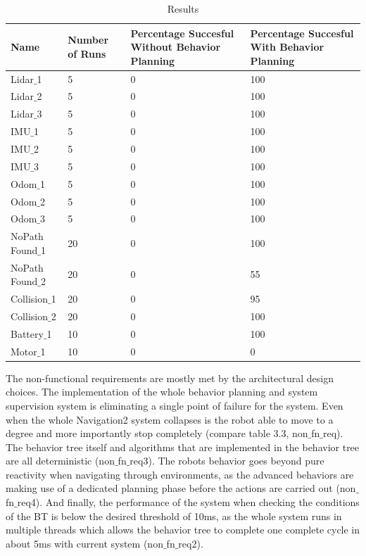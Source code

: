 \begin{table}[h!]
\caption{Results}
	\begin{tabular}{| m{} | m{}| m{} | m{}|} 
  	\hline
  	Name & Number of Runs &  Percentage Succesful Without Behavior Planning & Percentage Succesful With Behavior Planning\\ 
  	\hline
  	Lidar$\_$1 & 5 & 0 & 100 \\ 
  	\hline
  	Lidar$\_$2 & 5 & 0 & 100 \\ 
  	\hline
  	Lidar$\_$3 & 5 & 0 & 100 \\ 
  	\hline
  	IMU$\_$1 & 5 & 0 & 100 \\ 
  	\hline
  	IMU$\_$2 & 5 & 0 & 100 \\ 
  	\hline
  	IMU$\_$3 & 5 & 0 & 100 \\ 
  	\hline
  	Odom$\_$1 & 5 & 0 & 100 \\ 
  	\hline
  	Odom$\_$2 & 5 & 0 & 100 \\ 
  	\hline
  	Odom$\_$3 & 5 & 0 & 100 \\ 
  	\hline
  	NoPath Found$\_$1 & 20 & 0 & 100 \\ 
  	\hline
  	NoPath Found$\_$2 & 20 & 0 & 55 \\ 
  	\hline
  	Collision$\_$1 & 20 & 0 & 95 \\ 
  	\hline
  	Collision$\_$2 & 20 & 0 & 100 \\ 
  	\hline
  	Battery$\_$1 & 10 & 0 & 100 \\ 
  	\hline
  	Motor$\_$1 & 10 & 0 & 0 \\ 
  	\hline
	\end{tabular}
\end{table} 

The non-functional requirements are mostly met by the architectural design choices. 
The implementation of the whole behavior planning and system supervision system is eliminating a single point of failure for the system. Even when the whole Navigation2 system collapses is the robot able to move to a degree and more importantly stop completely (compare table 3.3, non$\_$fn$\_$req). The behavior tree itself and algorithms that are implemented in the behavior tree are all deterministic (non$\_$fn$\_$req3). The robots behavior goes beyond pure reactivity when navigating through environments, as the advanced behaviors are making use of a dedicated planning phase before the actions are carried out (non$\_$fn$\_$req4). 
And finally, the performance of the system when checking the conditions of the BT is below the desired threshold of 10ms, as the whole system runs in multiple threads which allows the behavior tree to complete one complete cycle in about 5ms with current system (non$\_$fn$\_$req2). 
